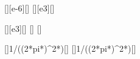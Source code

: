 [\micro\henry][e-6][\henry]
[\kilo\hertz][e3][\hertz]

[\kilo\hertz][e3][\hertz]
[\ohm]
[\ohm]

[]{1/((2*pi*\fzX)^2*\LzX)}[\farad]
[]{1/((2*pi*\faX)^2*\CX)}[\henry]
